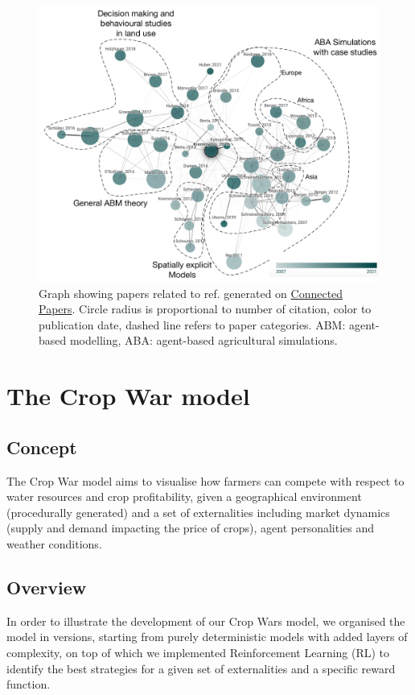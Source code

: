 \documentclass[a4paper,12pt]{article} %
\begin{document}
\begin{figure}[tb]
	\includegraphics[width=.8\textwidth]{Figures/StateOfTheArt2.pdf}
	\centering
	\caption{\small Graph showing papers related to ref. \cite{kremmydasReviewAgentBased2018} generated on \href{https://www.connectedpapers.com/main/35fac7b643317e5f48f5280fadec94051bf2401f/A-review-of-Agent-Based-Modeling-for-agricultural-policy-evaluation/graph}{Connected Papers}. Circle radius is proportional to number of citation, color to publication date, dashed line refers to paper categories. ABM: agent-based modelling, ABA: agent-based agricultural simulations.}
	\label{State_of_the_art}
\end{figure}

\section{The Crop War model}

\subsection{Concept}
The Crop War model aims to visualise how farmers can compete with respect to water resources and crop profitability, given a geographical environment (procedurally generated) and a set of externalities including market dynamics (supply and demand impacting the price of crops), agent personalities and weather conditions.

\subsection{Overview} \label{overview}
In order to illustrate the development of our Crop Wars model, we organised the model in versions, starting from purely deterministic models with added layers of complexity, on top of which we implemented Reinforcement Learning (RL) to identify the best strategies for a given set of externalities and a specific reward function.
\end{document}

